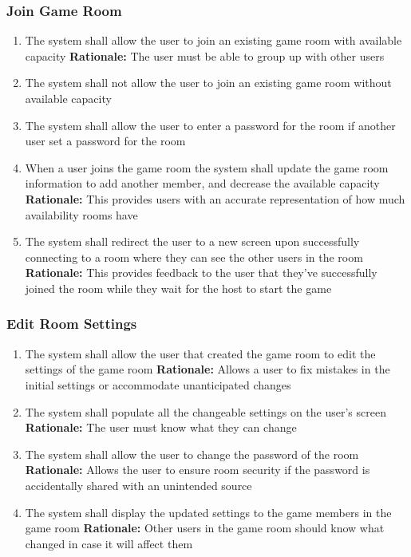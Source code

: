 \documentclass[12pt]{article}
\begin{document}
\subsubsection{Join Game Room}
\begin{enumerate}[label=JG\arabic*., series=JoinGame]
	\item The system shall allow the user to join an existing game room with available capacity \newline 
    \textbf{Rationale:} The user must be able to group up with other users
    \item The system shall not allow the user to join an existing game room without available capacity 
    \item The system shall allow the user to enter a password for the room if another user set a password for the room 
    \item When a user joins the game room the system shall update the game room information to add another member, and decrease the available capacity\newline 
    \textbf{Rationale:} This provides users with an accurate representation of how much availability rooms have
    \item The system shall redirect the user to a new screen upon successfully connecting to a room where they can see the other users in the room\newline 
    \textbf{Rationale:} This provides feedback to the user that they've successfully joined the room while they wait for the host to start the game
\end{enumerate}

\subsubsection{Edit Room Settings}
\begin{enumerate}[label=RS\arabic*., series=EditRoom]
	\item The system shall allow the user that created the game room to edit the settings of the game room\newline 
    \textbf{Rationale:} Allows a user to fix mistakes in the initial settings or accommodate unanticipated changes
    \item The system shall populate all the changeable settings on the user's screen\newline 
    \textbf{Rationale:} The user must know what they can change
    \item The system shall allow the user to change the password of the room\newline 
    \textbf{Rationale:} Allows the user to ensure room security if the password is accidentally shared with an unintended source
    \item The system shall display the updated settings to the game members in the game room\newline 
    \textbf{Rationale:} Other users in the game room should know what changed in case it will affect them
\end{enumerate}
\end{document}
